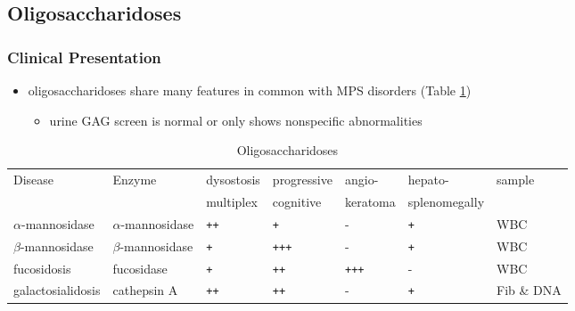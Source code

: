 \documentclass[12pt]{scrartcl}
\begin{document}
\subsection{Oligosaccharidoses}
\label{sec:org0bce369}
\subsubsection{Clinical Presentation}
\label{sec:org8849369}
\begin{itemize}
\item oligosaccharidoses share many features in common with MPS disorders (Table \ref{tab:orge3ebf64})
\begin{itemize}
\item urine GAG screen is normal or only shows nonspecific
abnormalities
\end{itemize}
\end{itemize}

\begin{table}[htbp]
\caption{\label{tab:orge3ebf64}Oligosaccharidoses}
\centering
\begin{tabular}{lllllll}
Disease & Enzyme & dysostosis & progressive & angio- & hepato- & sample\\
 &  & multiplex & cognitive & keratoma & splenomegally & \\
\hline
\(\alpha\)-mannosidase & \(\alpha\)-mannosidase & \texttt{++} & \texttt{+} & - & \texttt{+} & WBC\\
\(\beta\)-mannosidase & \(\beta\)-mannosidase & \texttt{+} & \texttt{+++} & - & \texttt{+} & WBC\\
fucosidosis & fucosidase & \texttt{+} & \texttt{++} & \texttt{+++} & - & WBC\\
galactosialidosis & cathepsin A & \texttt{++} & \texttt{++} & - & \texttt{+} & Fib \& DNA\\
\end{tabular}
\end{table}
\end{document}
